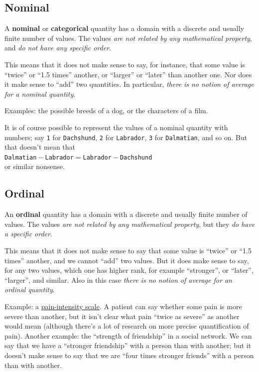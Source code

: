 \documentclass[
  a4paper,
  DIV=11,
  numbers=noendperiod,
  oneside]{scrreprt}
\begin{document}
\hypertarget{nominal}{%
\subsection{Nominal}\label{nominal}}

A {\textbf{nominal}} or {\textbf{categorical}} quantity has a domain
with a discrete and usually finite number of values. The values
{\emph{are not related by any mathematical property}}, and {\emph{do not
have any specific order}}.

This means that it does not make sense to say, for instance, that some
value is ``twice'' or ``1.5 times'' another, or ``larger'' or ``later''
than another one. Nor does it make sense to ``add'' two quantities. In
particular, {\emph{there is no notion of average for a nominal
quantity}}.

Examples: the possible breeds of a dog, or the characters of a film.

It is of course possible to represent the values of a nominal quantity
with numbers; say \texttt{1} for \texttt{Dachshund}, \texttt{2} for
\texttt{Labrador}, \texttt{3} for \texttt{Dalmatian}, and so on. But
that doesn't mean that\\
\texttt{Dalmatian}\({}-{}\)\texttt{Labrador}\({}={}\)\texttt{Labrador}\({}-{}\)\texttt{Dachshund}\\
or similar nonsense.

\hypertarget{ordinal}{%
\subsection{Ordinal}\label{ordinal}}

An {\textbf{ordinal}} quantity has a domain with a discrete and usually
finite number of values. The values {\emph{are not related by any
mathematical property}}, but they {\emph{do have a specific order}}.

This means that it does not make sense to say that some value is
``twice'' or ``1.5 times'' another, and we cannot ``add'' two values.
But it does make sense to say, for any two values, which one has higher
rank, for example ``stronger'', or ``later'', ``larger'', and similar.
Also in this case {\emph{there is no notion of average for an ordinal
quantity}}.

Example: a
\href{https://doi.org/10.1016/j.jpainsymman.2004.08.007}{pain-intensity
scale}. A patient can say whether some pain is more severe than another,
but it isn't clear what pain ``twice as severe'' as another would mean
(although there's a lot of research on more precise quantification of
pain). Another example: the ``strength of friendship'' in a social
network. We can say that we have a ``stronger friendship'' with a person
than with another; but it doesn't make sense to say that we are ``four
times stronger friends'' with a person than with another.
\end{document}
